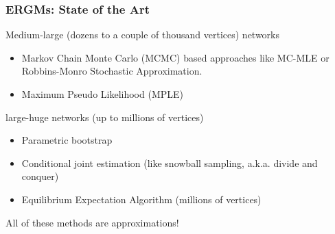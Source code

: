 \documentclass[aspectratio=169, 9pt]{beamer}
\begin{document}
\begin{frame}[label=art]
\frametitle{ERGMs: State of the Art}
\pause
Medium-large (dozens to a couple of thousand vertices) networks

\begin{itemize}
\item Markov Chain Monte Carlo (MCMC) based approaches like MC-MLE or Robbins-Monro Stochastic Approximation. \hyperlink{mcmle}{}
\item Maximum Pseudo Likelihood (MPLE)
\end{itemize}\pause

large-huge networks (up to millions of vertices)

\begin{itemize}
\item Parametric bootstrap
\item Conditional joint estimation (like snowball sampling, a.k.a. divide and conquer)
\item Equilibrium Expectation Algorithm (millions of vertices)
\end{itemize}\pause

All of these methods are approximations!

\end{frame}
\end{document}
